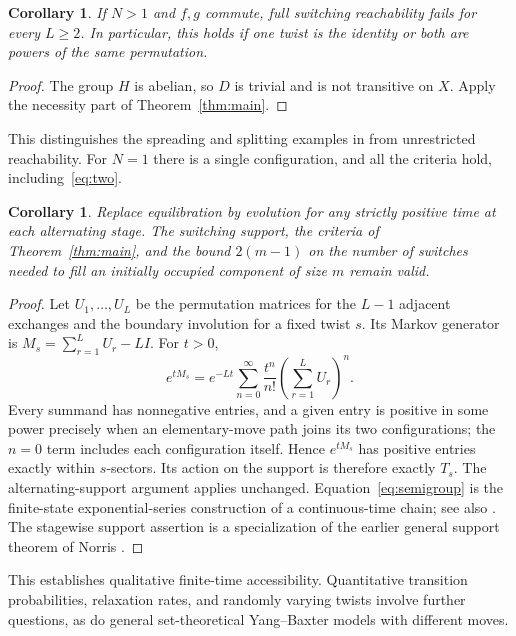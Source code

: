 \documentclass[11pt]{article}
\newtheorem{corollary}[theorem]{Corollary}
\theoremstyle{remark}
\begin{document}
\begin{corollary}\label{cor:commuting}
If $N>1$ and $f,g$ commute, full switching reachability fails for every $L\geq2$.
In particular, this holds if one twist is the identity or both are powers of
the same permutation.
\end{corollary}
\begin{proof}
The group $H$ is abelian, so $D$ is trivial and is not transitive on $X$.
Apply the necessity part of Theorem~\ref{thm:main}.
\end{proof}
This distinguishes the spreading and splitting examples in
\cite[Sections~5.3--5.4]{DPR} from unrestricted reachability.
For $N=1$ there is a single configuration, and all the criteria hold,
including~\eqref{eq:two}.

\begin{corollary}\label{cor:finite}
Replace equilibration by evolution for any strictly positive time at each
alternating stage. The switching support, the criteria of
Theorem~\ref{thm:main}, and the bound $2(m-1)$ on the number of switches needed
to fill an initially occupied component of size $m$ remain valid.
\end{corollary}
\begin{proof}
Let $U_1,\ldots,U_L$ be the permutation matrices for the $L-1$ adjacent
exchanges and the boundary involution for a fixed twist $s$.
Its Markov generator is $M_s=\sum_{r=1}^{L}U_r-LI$.
For $t>0$,
\begin{equation}\label{eq:semigroup}
 e^{tM_s}=e^{-Lt}\sum_{n=0}^{\infty}\frac{t^n}{n!}
             \left(\sum_{r=1}^{L}U_r\right)^n.
\end{equation}
Every summand has nonnegative entries, and a given entry is positive in some
power precisely when an elementary-move path joins its two configurations;
the $n=0$ term includes each configuration itself. Hence $e^{tM_s}$ has
positive entries exactly within $s$-sectors. Its action on the support is
therefore exactly $T_s$. The alternating-support argument applies unchanged.
Equation~\eqref{eq:semigroup} is the finite-state exponential-series
construction of a continuous-time chain; see also \cite[Section~20.1]{LP}.
The stagewise support assertion is a specialization of the earlier general
support theorem of Norris \cite[Theorem~3.2.1, p.~111]{Norris}.
\end{proof}
This establishes qualitative finite-time accessibility. Quantitative transition
probabilities, relaxation rates, and randomly varying twists involve further
questions, as do general set-theoretical Yang--Baxter models with different moves.
\end{document}
